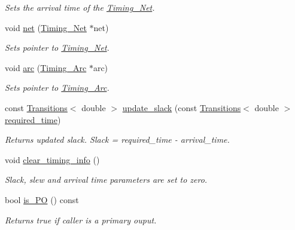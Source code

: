 \begin{DoxyCompactItemize}
\begin{DoxyCompactList}\small\item\em Sets the arrival time of the \hyperlink{classTiming__Analysis_1_1Timing__Net}{Timing\-\_\-\-Net}. \end{DoxyCompactList}\item 
void \hyperlink{classTiming__Analysis_1_1Timing__Point_ab17571917e751e2d9bdd8dc11404bb66}{net} (\hyperlink{classTiming__Analysis_1_1Timing__Net}{Timing\-\_\-\-Net} $\ast$net)
\begin{DoxyCompactList}\small\item\em Sets pointer to \hyperlink{classTiming__Analysis_1_1Timing__Net}{Timing\-\_\-\-Net}. \end{DoxyCompactList}\item 
void \hyperlink{classTiming__Analysis_1_1Timing__Point_a7db0f9baed61c0534e19c2009ac41db5}{arc} (\hyperlink{classTiming__Analysis_1_1Timing__Arc}{Timing\-\_\-\-Arc} $\ast$arc)
\begin{DoxyCompactList}\small\item\em Sets pointer to \hyperlink{classTiming__Analysis_1_1Timing__Arc}{Timing\-\_\-\-Arc}. \end{DoxyCompactList}\item 
const \hyperlink{classTransitions}{Transitions}$<$ double $>$ \hyperlink{classTiming__Analysis_1_1Timing__Point_a62c2af027f267f45294b593f880bfe2d}{update\-\_\-slack} (const \hyperlink{classTransitions}{Transitions}$<$ double $>$ \hyperlink{classTiming__Analysis_1_1Timing__Point_aab60710f64cbc89f7316515aaca8ea17}{required\-\_\-time})
\begin{DoxyCompactList}\small\item\em Returns updated slack. Slack = required\-\_\-time -\/ arrival\-\_\-time. \end{DoxyCompactList}\item 
void \hyperlink{classTiming__Analysis_1_1Timing__Point_a737bfc39dc3271c9b605d1d16ba8816c}{clear\-\_\-timing\-\_\-info} ()
\begin{DoxyCompactList}\small\item\em Slack, slew and arrival time parameters are set to zero. \end{DoxyCompactList}\item 
bool \hyperlink{classTiming__Analysis_1_1Timing__Point_a2223c8ec07ef018d39db5c7e03df90a9}{is\-\_\-\-P\-O} () const 
\begin{DoxyCompactList}\small\item\em Returns true if caller is a primary ouput. \end{DoxyCompactList}\item 

\end{DoxyCompactItemize}
